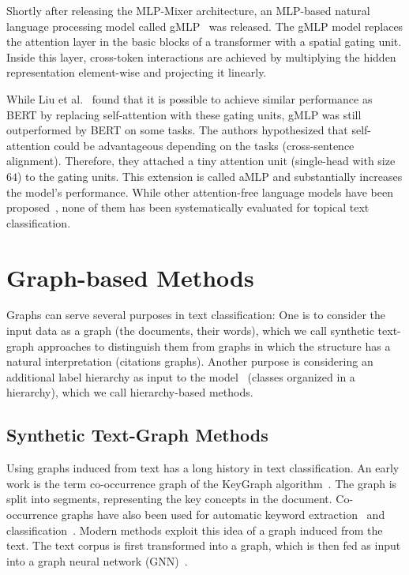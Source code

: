 \documentclass[acmsmall,nonacm]{acmart}
\begin{document}
Shortly after releasing the MLP-Mixer architecture, an MLP-based natural language processing model called gMLP~\cite{DBLP:journals/corr/abs-2105-08050} was released. 
The gMLP model replaces the attention layer in the basic blocks of a transformer with a spatial gating unit. 
Inside this layer, cross-token interactions are achieved by multiplying the hidden representation element-wise and projecting it linearly. 

While Liu et al.~\cite{DBLP:journals/corr/abs-2105-08050} found that it is possible to achieve similar performance as BERT by replacing self-attention with these gating units, gMLP was still outperformed by BERT on some tasks.
The authors hypothesized that self-attention could be advantageous depending on the tasks (\ie cross-sentence alignment).
Therefore, they attached a tiny attention unit (single-head with size $64$) to the gating units. 
This extension is called aMLP and substantially increases the model's performance.
While other attention-free language models have been proposed~\cite{pengRWKVReinventingRNNs2023a,guMambaLinearTimeSequence2023b}, none of them has been systematically evaluated for topical text classification.

\section{Graph-based Methods}\label{sec:graph}

Graphs can serve several purposes in text classification: One is to consider the input data as a graph (\ie the documents, their words), which we call synthetic text-graph approaches to distinguish them from graphs in which the structure has a natural interpretation (\eg citations graphs). Another purpose is considering an additional label hierarchy as input to the model~\cite{DBLP:journals/csur/Sebastiani02} (\ie classes organized in a hierarchy), which we call hierarchy-based methods.

\subsection{Synthetic Text-Graph Methods}

Using graphs induced from text has a long history in text classification. 
An early work is the term co-occurrence graph of the KeyGraph algorithm~\cite{DBLP:conf/adl/OhsawaBY98}.
The graph is split into segments, representing the key concepts in the document.
Co-occurrence graphs have also been used for automatic keyword extraction~\cite{Rose2010} and classification~\cite{DBLP:conf/emnlp/ZhangDXLZ21}.
Modern methods exploit this idea of a graph induced from the text.
The text corpus is first transformed into a graph, which is then fed as input into a graph neural network (GNN)~\cite{book:hamilton:grl}.
\end{document}
